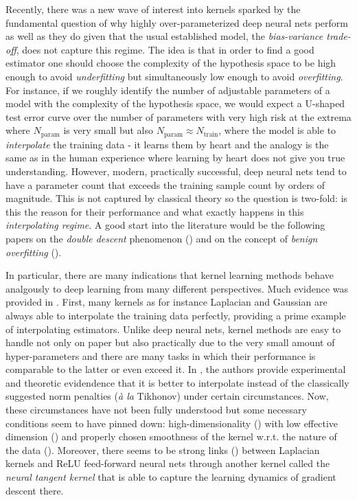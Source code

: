 \documentclass[12pt]{amsart}
\begin{document}
Recently, there was a new wave of interest into kernels sparked by the 
fundamental question of why highly over-parameterized deep neural nets
perform as well as they do given that the usual established model, 
the \emph{bias-variance trade-off}, does not capture this regime.
The idea is that in order to find a good estimator one should choose 
the complexity of the hypothesis space to be high enough to avoid 
\emph{underfitting} but simultaneously low enough to avoid 
\emph{overfitting}.
For instance, if we roughly identify the number of adjustable parameters
of a model with the complexity of the hypothesis space, we would expect
a U-shaped test error curve over the number of parameters with very high
risk at the extrema where $N_{\textrm{param}}$ is very small but also
$N_{\textrm{param}} \approx N_{\textrm{train}}$, where the model is able
to \emph{interpolate} the training data - it learns them by heart and 
the analogy is the same as in the human experience where learning by heart
does not give you true understanding.
However, modern, practically successful, deep neural nets tend to have a
parameter count that exceeds the training sample count by orders of 
magnitude.
This is not captured by classical theory so the question is two-fold:
is this the reason for their performance and 
what exactly happens in this \emph{interpolating regime}.
A good start into the literature would be the following papers on 
the \emph{double descent} phenomenon (\cite{doubledescent}) and on the
concept of \emph{benign overfitting} (\cite{benignoverfitting}).

In particular, there are many indications that kernel learning methods 
behave analgously to deep learning from many different perspectives.
Much evidence was provided in \cite{understandkernels}.
First, many kernels as for instance Laplacian and Gaussian are always 
able to interpolate the training data perfectly, providing a prime example
of interpolating estimators.
Unlike deep neural nets, kernel methods are easy to handle not only on 
paper but also practically due to the very small amount of hyper-parameters
and there are many tasks in which their performance is comparable to the 
latter or even exceed it.
In \cite{justinterpolate}, the authors provide experimental and theoretic 
evidendence that it is better to interpolate instead of the classically 
suggested norm penalties (\textit{à la} Tikhonov) under certain circumstances.
Now, these circumstances have not been fully understood but some necessary 
conditions seem to have pinned down:
high-dimensionality (\cite{laplaceconsistency,benignoverfitting}) 
with low effective dimension (\cite{benignoverfitting})
and properly chosen smoothness of the kernel w.r.t. the nature of the data 
(\cite{justinterpolate}).
Moreover, there seems to be strong links (\cite{ntklaplacian}) between 
Laplacian kernels and ReLU feed-forward neural nets through another kernel 
called the \emph{neural tangent kernel} that is able to capture the 
learning dynamics of gradient descent there.
\end{document}
